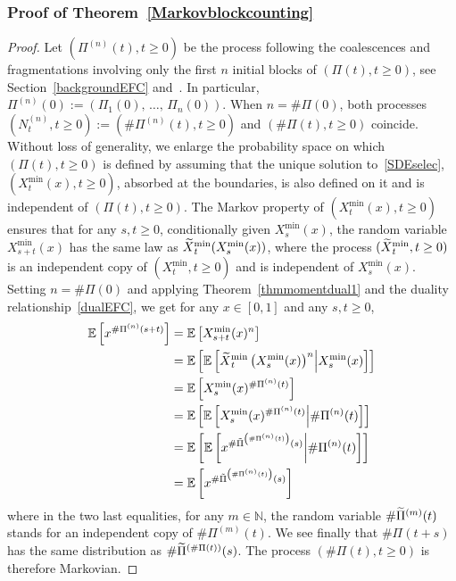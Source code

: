 \documentclass[10pt]{amsart}
\theoremstyle{definition}\newtheorem{defi}[theo]{Definition}\newtheorem{rema}[theo]{Remark}\newtheorem{exam}[theo]{Example}\newtheorem{exem}[theo]{Example}\newtheorem{nota}[theo]{Notation}
\newcommand{\bbN}{\mathbb{N}}
\newcommand{\bbE}{\mathbb{E}}
\let\oldtilde\tilde
\renewcommand*{\tilde}[1]{\mathchoice{\widetilde{#1}}{\widetilde{#1}}{\oldtilde{#1}}{\oldtilde{#1}}}
\begin{document}
\subsubsection{Proof of Theorem~\ref{Markovblockcounting}}

\begin{proof}
Let $(\Pi^{(n)}(t),t\geq 0)$ be the process following the coalescences and fragmentations involving only the first $n$ initial blocks of $(\Pi(t),t\geq 0)$, see Section~\ref{backgroundEFC} and~\cite[Lemma~3.3 and Lemma~3.4]{cdiEFC}. In particular, $\Pi^{(n)}(0):=(\Pi_1(0),\,\ldots,\,\Pi_n(0))$. When $n=\#\Pi(0)$, both processes $(N_t^{(n)},t\geq 0):=(\#\Pi^{(n)}(t),t\geq 0)$ and $(\#\Pi(t),t\geq 0)$ coincide. Without loss of generality, we enlarge the probability space on which $(\Pi(t),t\geq 0)$ is defined by assuming that the unique solution to~\eqref{SDEselec}, $(X_t^{\min}(x),t\geq 0)$, absorbed at the boundaries, is also defined on it and is independent of $(\Pi(t),t\geq 0)$. The Markov property of $(X_t^{\min}(x),t\geq 0)$ ensures that for any $s,t\geq 0$, conditionally given $X^{\min}_s(x)$, the random variable $X_{s+t}^{\min}(x)$ has the same law as $\tilde{X}_t^{\min}(X_{s}^{\min}(x))$, where the process $(\tilde{X}_t^{\min},t\geq 0)$ is an independent copy of $(X_t^{\min},t\geq 0)$ and is independent of $X_s^{\min}(x)$. Setting $n=\#\Pi(0)$ and applying Theorem~\ref{thmmomentdual1} and the duality relationship~\eqref{dualEFC}, we get for any $x\in [0,1]$ and any $s,t\geq 0$,
\begin{align*}
\bbE\left[x^{\#\Pi^{(n)}(s+t)}\right]&=\bbE\left[X_{s+t}^{\min}(x)^{n}\right]\\
&=\bbE\left[\bbE\left[\tilde{X}_{t}^{\min}\left(X_{s}^{\min}(x)\right)^{n}\middle|X_{s}^{\min}(x)\right]\right]\\
&=\bbE\left[X_s^{\min}(x)^{\#\Pi^{(n)}(t)}\right]\\
&=\bbE\left[\bbE\left[X_s^{\min}(x)^{\#\Pi^{(n)}(t)}\middle|\#\Pi^{(n)}(t)\right]\right]\\
&=\bbE\left[\bbE\left[x^{\#\tilde{\Pi}^{\left(\#\Pi^{(n)}(t)\right)}(s)}\middle|\#\Pi^{(n)}(t)\right]\right]\\
&=\bbE\left[x^{\#\tilde{\Pi}^{\left(\#\Pi^{(n)}(t)\right)}(s)}\right]
\end{align*}
where in the two last equalities, for any $m\in \bbN$, the random variable $\#\tilde{\Pi}^{(m)}(t)$ stands for an independent copy of $\#\Pi^{(m)}(t)$. We see finally that $\#\Pi(t+s)$ has the same distribution as $\#\tilde{\Pi}^{(\#\Pi(t))}(s)$. The process $(\#\Pi(t),t\geq 0)$ is therefore Markovian.


\end{proof}
\end{document}
